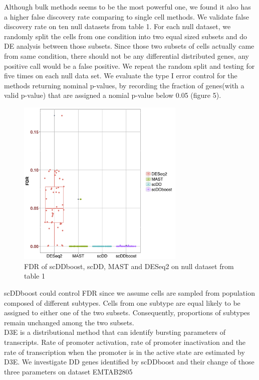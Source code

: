 \documentclass[11pt]{amsart}
\begin{document}
Although bulk methods seems to be the most powerful one, we found it also has a higher false discovery rate comparing to single cell methods. We validate false discovery rate on ten null datasets from table 1. For each null dataset, we randomly split the cells from one condition into two equal sized subsets and do DE analysis between those subsets. Since those two subsets of cells actually came from same condition, there should not be any differential distributed genes, any positive call would be a false positive. We repeat the random split and testing for five times on each null data set. We evaluate the type I error control for the methods returning nominal p-values, by recording the fraction of genes(with a valid p-value) that are assigned a nomial p-value below 0.05 (figure 5).\\
\begin{figure}[H]
\includegraphics[height = 8cm]{FDR.png}
 \caption{FDR of scDDboost, scDD, MAST and DESeq2 on null dataset from table 1}
  \label{fig:7}
\end{figure}
scDDboost could control FDR since we assume cells are sampled from population composed of different subtypes. Cells from one subtype are equal likely to be assigned to either one of the two subsets. Consequently, proportions of subtypes remain unchanged among the two subsets.\\
D3E\cite{ref:d3e} is a distributional method that can identify bursting parameters of transcripts. Rate of promoter activation, rate of promoter inactivation and the rate of transcription when the promoter is in the active state are estimated by D3E.  We investigate DD genes identified by scDDboost and their change of those three parameters on dataset EMTAB2805\\
\end{document}
